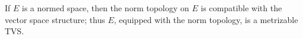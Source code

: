If $E$ is a normed space, then the norm topology on $E$ is compatible with the vector space structure; thus $E$, equipped with the norm topology, is a metrizable TVS.
